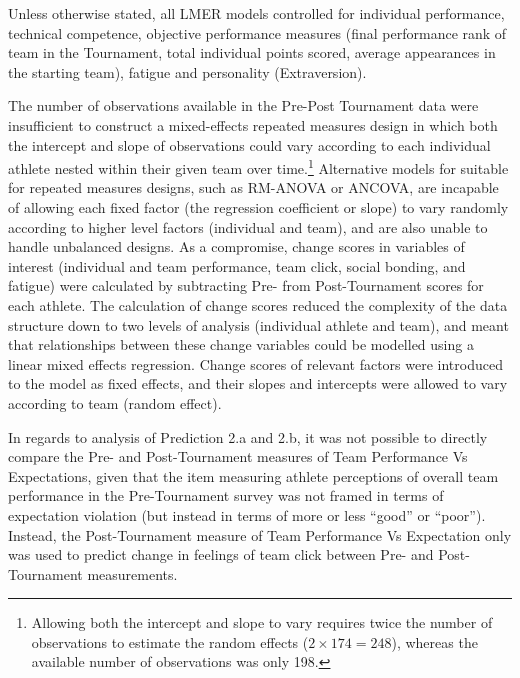 \begin{CJK}{UTF8}{gbsn}

Unless otherwise stated, all LMER models controlled for individual performance, technical competence, objective performance measures (final performance rank of team in the Tournament, total individual points scored, average appearances in the starting team), fatigue and personality (Extraversion).


 The number of observations available in the Pre-Post Tournament data were insufficient to construct a mixed-effects repeated measures design in which both the intercept and slope of observations could vary according to each individual athlete nested within their given team over time.\footnote{Allowing both the intercept and slope to vary requires twice the number of observations to estimate the random effects ($2\times174 = 248$), whereas the available number of observations was only 198.}
 Alternative models for suitable for repeated measures designs, such as RM-ANOVA or ANCOVA, are incapable of allowing each fixed factor (the regression coefficient or slope) to vary randomly according to higher level factors (individual and team), and are also unable to handle unbalanced designs.  As a compromise, change scores in variables of interest (individual and team performance, team click, social bonding, and fatigue) were calculated by subtracting Pre- from Post-Tournament scores for each athlete. The calculation of change scores reduced the complexity of the data structure down to two levels of analysis (individual athlete and team), and meant that relationships between these change variables could be modelled using a linear mixed effects regression.  Change scores of relevant factors were introduced to the model as fixed effects, and their slopes and intercepts were allowed to vary according to team (random effect).

 In regards to analysis of Prediction 2.a and 2.b, it was not possible to directly compare the Pre- and Post-Tournament measures of Team Performance Vs Expectations, given that the item measuring athlete perceptions of overall team performance in the Pre-Tournament survey was not framed in terms of expectation violation (but instead in terms of more or less ``good'' or ``poor'').  Instead, the Post-Tournament measure of Team Performance Vs Expectation only was used to predict change in feelings of team click between Pre- and Post-Tournament measurements.



\end{CJK}
